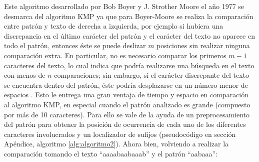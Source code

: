 Este algoritmo desarrollado por Bob Boyer y J. Strother Moore el año 1977 se desmarca del algoritmo KMP ya que para Boyer-Moore se realiza la comparación entre patrón y texto de derecha a izquierda, por ejemplo si hubiera una discrepancia en el último carácter del patrón y el carácter del texto no aparece en todo el patrón, entonces éste se puede deslizar $m$ posiciones sin realizar ninguna comparación extra. En particular, no es necesario comparar los primeros $m-1$ caracteres del texto, lo cual indica que podría realizarse una búsqueda en el texto con menos de $n$ comparaciones; sin embargo, si el carácter discrepante del texto se encuentra dentro del patrón, éste podría desplazarse en un número menor de espacios \cite{boyermoore}. Esto le entrega una gran ventaja de tiempo y espacio en comparación al algoritmo KMP, en especial cuando el patrón analizado es grande (compuesto por más de 10 caracteres). Para ello se vale de la ayuda de un preprocesamiento del patrón para obtener la posición de ocurrencia de cada uno de los diferentes caracteres involucrados y un localizador de sufijos (pseudocódigo en sección Apéndice, algoritmo \ref{alg:algoritmo2}). Ahora bien, volviendo a realizar la comparación tomando el texto ``aaaabaabaaab'' y el patrón ``aabaaa'': 

